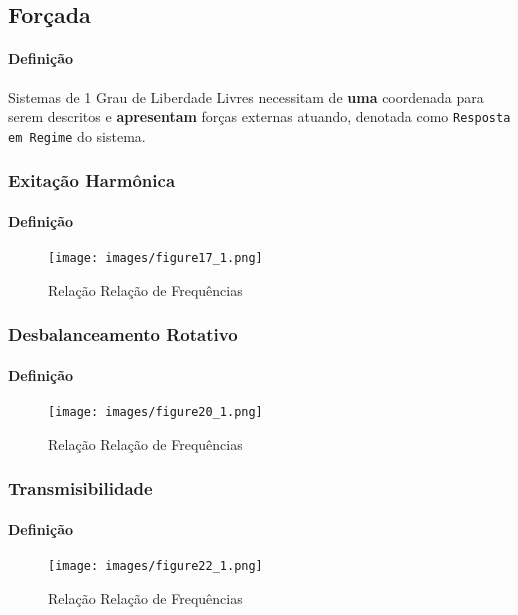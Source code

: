 \documentclass{article}
\begin{document}
\newpage\subsection{Forçada}
    \paragraph{Definição}Sistemas de 1 Grau de Liberdade Livres necessitam de \textbf{uma} coordenada para serem descritos e \textbf{apresentam} forças externas atuando, denotada como \texttt{Resposta em Regime} do sistema.

\subsubsection{Exitação Harmônica}
    \paragraph{Definição}
    \begin{figure}[H]
        \centering
        \texttt{[image: images/figure17\_1.png]}
        \caption{Relação Relação de Frequências}
    \end{figure} \noindent

\subsubsection{Desbalanceamento Rotativo}
    \paragraph{Definição}
    \begin{figure}[H]
        \centering
        \texttt{[image: images/figure20\_1.png]}
        \caption{Relação Relação de Frequências}
    \end{figure} \noindent

\subsubsection{Transmisibilidade}
    \paragraph{Definição}
    \begin{figure}[H]
        \centering
        \texttt{[image: images/figure22\_1.png]}
        \caption{Relação Relação de Frequências}
    \end{figure} \noindent
\end{document}
